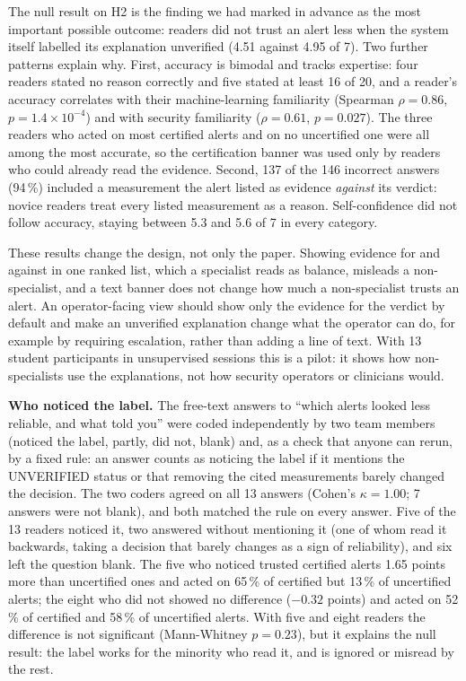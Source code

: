 The null result on H2 is the finding we had marked in advance as the most important possible outcome: readers did not trust an alert less when the system itself labelled its explanation unverified (4.51 against 4.95 of 7). Two further patterns explain why. First, accuracy is bimodal and tracks expertise: four readers stated no reason correctly and five stated at least 16 of 20, and a reader's accuracy correlates with their machine-learning familiarity (Spearman $\rho = 0.86$, $p = 1.4\times10^{-4}$) and with security familiarity ($\rho = 0.61$, $p = 0.027$). The three readers who acted on most certified alerts and on no uncertified one were all among the most accurate, so the certification banner was used only by readers who could already read the evidence. Second, 137 of the 146 incorrect answers (94\,\%) included a measurement the alert listed as evidence \emph{against} its verdict: novice readers treat every listed measurement as a reason. Self-confidence did not follow accuracy, staying between 5.3 and 5.6 of 7 in every category.

These results change the design, not only the paper. Showing evidence for and against in one ranked list, which a specialist reads as balance, misleads a non-specialist, and a text banner does not change how much a non-specialist trusts an alert. An operator-facing view should show only the evidence for the verdict by default and make an unverified explanation change what the operator can do, for example by requiring escalation, rather than adding a line of text. With 13 student participants in unsupervised sessions this is a pilot: it shows how non-specialists use the explanations, not how security operators or clinicians would.

\noindent\textbf{Who noticed the label.} The free-text answers to ``which alerts looked less reliable, and what told you'' were coded independently by two team members (noticed the label, partly, did not, blank) and, as a check that anyone can rerun, by a fixed rule: an answer counts as noticing the label if it mentions the UNVERIFIED status or that removing the cited measurements barely changed the decision. The two coders agreed on all 13 answers (Cohen's $\kappa = 1.00$; 7 answers were not blank), and both matched the rule on every answer. Five of the 13 readers noticed it, two answered without mentioning it (one of whom read it backwards, taking a decision that barely changes as a sign of reliability), and six left the question blank. The five who noticed trusted certified alerts 1.65 points more than uncertified ones and acted on 65\,\% of certified but 13\,\% of uncertified alerts; the eight who did not showed no difference ($-0.32$ points) and acted on 52\,\% of certified and 58\,\% of uncertified alerts. With five and eight readers the difference is not significant (Mann-Whitney $p = 0.23$), but it explains the null result: the label works for the minority who read it, and is ignored or misread by the rest.
